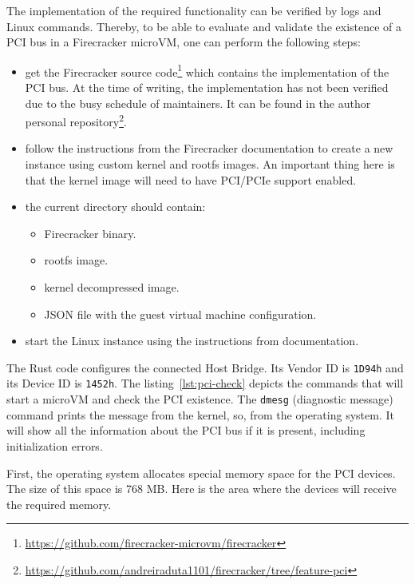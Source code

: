 \documentclass[12pt, a4paper]{report}
\begin{document}
The implementation of the required functionality can be verified by logs and Linux commands. Thereby, to be able to evaluate and validate the existence of a PCI bus in a Firecracker microVM, one can perform the following steps:
\begin{itemize}
    \item get the Firecracker source code\footnote{\url{https://github.com/firecracker-microvm/firecracker}} which contains the implementation of the PCI bus.
    At the time of writing, the implementation has not been verified due to the busy schedule of maintainers. It can be found in the author personal repository\footnote{\url{https://github.com/andreiraduta1101/firecracker/tree/feature-pci}}.

    \item follow the instructions from the Firecracker documentation to create a new instance using custom kernel and rootfs images. An important thing here is that the kernel image will need to have PCI/PCIe support enabled.

    \item the current directory should contain:
    \begin{itemize}
        \item Firecracker binary.
        \item rootfs image.
        \item kernel decompressed image.
        \item JSON file with the guest virtual machine configuration.
    \end{itemize}

    \item start the Linux instance using the instructions from documentation.
\end{itemize}

The Rust code configures the connected Host Bridge. Its Vendor ID is \texttt{1D94h} and its Device ID is  \texttt{1452h}.  The listing~\ref{lst:pci-check} depicts the commands that will start a microVM and check the PCI existence. The \texttt{dmesg} (diagnostic message) command prints the message from the kernel, so, from the operating system. It will show all the information about the PCI bus if it is present, including initialization errors.



First, the operating system allocates special memory space for the PCI devices. The size of this space is 768 MB. Here is the area where the devices will receive the required memory.
\end{document}
